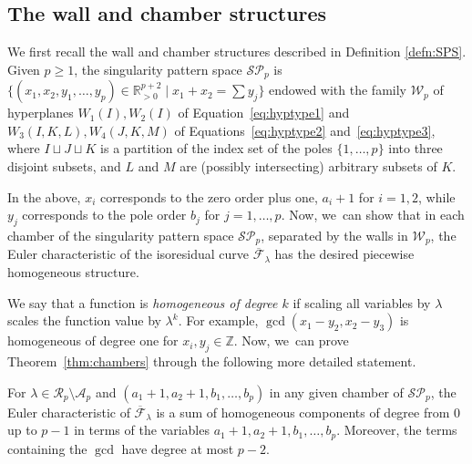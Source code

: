 \subsection{The wall and chamber structures}\label{sub:Discretecombinatorics}

We first recall the wall and chamber structures described in Definition \ref{defn:SPS}.
Given $p \geq 1$, the singularity pattern space $\mathcal{SP}_{p}$ is $\bigl\{ (x_{1},x_{2},y_{1},\dots,y_{p}) \in \mathbb{R}_{>0}^{p+2} \mid x_{1}+x_{2}= \sum y_{j} \bigr\}$ endowed with the family $\mathcal{W}_{p}$ of hyperplanes $W_{1}(I),W_{2}(I)$ of Equation~\eqref{eq:hyptype1} and $W_{3}(I,K,L),W_{4}(J,K,M)$ of Equations~\eqref{eq:hyptype2} and~\eqref{eq:hyptype3}, where $I \sqcup J \sqcup K$ is a partition of the index set of the poles $\lbrace{ 1,\dots,p \rbrace}$ into three disjoint subsets, and $L$ and $M$ are (possibly intersecting) arbitrary subsets of $K$.

In the above, $x_i$ corresponds to the zero order plus one, \ie $a_i+1$ for $i=1,2$, while $y_j$ corresponds to the pole order $b_j$ for $j=1,\ldots,p$. Now, we~can show that in each chamber of the singularity pattern space $\mathcal{SP}_p$, separated by the walls in $\mathcal{W}_{p}$, the Euler characteristic of the isoresidual curve $\overline{\mathcal{F}}_\lambda$ has the desired piecewise homogeneous structure.

We say that a function is {\em homogeneous of degree $k$} if scaling all variables by $\lambda$ scales the function value by $\lambda^k$. For example, $\gcd(x_1 - y_2, x_2 - y_3)$ is homogeneous of degree one for
$x_i, y_j\in \mathbb{Z}$. Now, we~can prove Theorem~\ref{thm:chambers} through the following more detailed statement.

\begin{prop}\label{prop:chambers}
For $\lambda \in \mathcal{R}_{p}\setminus \mathcal{A}_{p}$ and $(a_1+1, a_2+1, b_1, \ldots, b_p)$ in any given chamber of $\mathcal{SP}_p$, the Euler characteristic of $\overline{\mathcal F}_\lambda$ is a sum of homogeneous components of degree from $0$ up to $p-1$ in terms of the variables $a_{1}+1,a_{2}+1,b_{1},\dots,b_{p}$. Moreover, the terms containing the $\gcd$ have degree at most $p-2$.
\end{prop}


